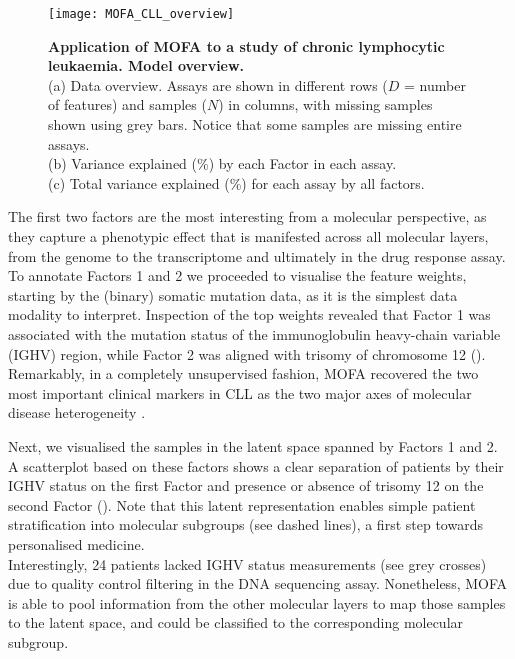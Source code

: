 \begin{figure}[H]
	\centering 	
	\texttt{[image: MOFA\_CLL\_overview]}
	\caption{\textbf{Application of MOFA to a study of chronic lymphocytic leukaemia. Model overview.}\\
	(a) Data overview. Assays are shown in different rows ($D$ = number of features) and samples ($N$) in columns, with missing samples shown using grey bars. Notice that some samples are missing entire assays.\\
	(b) Variance explained (\%) by each Factor in each assay.\\
	(c) Total variance explained (\%) for each assay by all factors.
	}
	\label{fig:MOFA_CLL_overview}
\end{figure}

The first two factors are the most interesting from a molecular perspective, as they capture a phenotypic effect that is manifested across all molecular layers, from the genome to the transcriptome and ultimately in the drug response assay.\\
To annotate Factors 1 and 2 we proceeded to visualise the feature weights, starting by the (binary) somatic mutation data, as it is the simplest data modality to interpret. Inspection of the top weights revealed that Factor 1 was associated with the mutation status of the immunoglobulin heavy-chain variable (IGHV) region, while Factor 2 was aligned with trisomy of chromosome 12 ().\\
Remarkably, in a completely unsupervised fashion, MOFA recovered the two most important clinical markers in CLL as the two major axes of molecular disease heterogeneity \cite{Fabbri2016,Bulian2017,Crombie2017}.

Next, we visualised the samples in the latent space spanned by Factors 1 and 2. A scatterplot based on these factors shows a clear separation of patients by their IGHV status on the first Factor and presence or absence of trisomy 12 on the second Factor (). Note that this latent representation enables simple patient stratification into molecular subgroups (see dashed lines), a first step towards personalised medicine.\\
Interestingly, 24 patients lacked IGHV status measurements (see grey crosses) due to quality control filtering in the DNA sequencing assay. Nonetheless, MOFA is able to pool information from the other molecular layers to map those samples to the latent space, and could be classified to the corresponding molecular subgroup.

